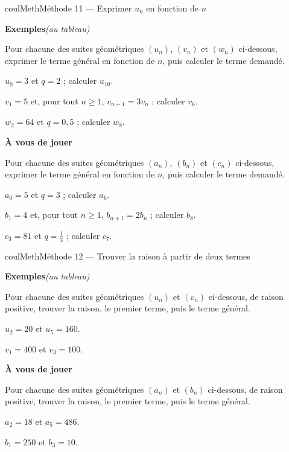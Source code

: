 \documentclass[11pt,a4paper]{article}
\makeatletter
\renewcommand{\ge}{\geqslant}
\newcounter{lycee@signet}
\newcommand{\signet}[3][]{\stepcounter{lycee@signet}%
  \edef\lycee@dest{\if\relax\detokenize{#1}\relax
    signet.\arabic{lycee@signet}\else#1\fi}%
  \hypertarget{\lycee@dest}{}\bookmark[level=#2,dest=\lycee@dest]{#3}}
\newcounter{methode}
\newenvironment{methodebox}[1][Méthode]{\stepcounter{methode}%
  \begin{boitecours}[phantom={\signet[methode-\arabic{methode}]{2}{#1}}]{coulMeth}{#1}}%
  {\end{boitecours}}
\newcommand{\etape}[1]{\par\smallskip\textbf{\color{coulMeth}#1}\par\nobreak\smallskip}
\newcommand{\autableau}{\hfill{\footnotesize\itshape\color{black!45}(au tableau)}}
\newcommand{\etapeexemples}{%
    \par\smallskip\textbf{\color{coulMeth}Exemples}\autableau\par\nobreak\smallskip}
\makeatother
\begin{document}
\begin{methodebox}[Méthode 11 --- Exprimer $u_{n}$ en fonction de $n$]
\etapeexemples
Pour chacune des suites géométriques $(u_{n})$, $(v_{n})$ et $(w_{n})$ ci-dessous, exprimer
le terme général en fonction de $n$, puis calculer le terme demandé.
\begin{questions}[label=\alph*)]
  \item $u_{0}=3$ et $q=2$ ; calculer $u_{10}$.
  \item $v_{1}=5$ et, pour tout $n\ge 1$, $v_{n+1}=3v_{n}$ ; calculer $v_{6}$.
  \item $w_{2}=64$ et $q=0{,}5$ ; calculer $w_{8}$.
\end{questions}

\etape{À vous de jouer}
Pour chacune des suites géométriques $(a_{n})$, $(b_{n})$ et $(c_{n})$ ci-dessous, exprimer
le terme général en fonction de $n$, puis calculer le terme demandé.
\begin{questions}[label=\alph*)]
  \item $a_{0}=5$ et $q=3$ ; calculer $a_{6}$.
  \item $b_{1}=4$ et, pour tout $n\ge 1$, $b_{n+1}=2b_{n}$ ; calculer $b_{8}$.
  \item $c_{3}=81$ et $q=\frac{1}{3}$ ; calculer $c_{7}$.
\end{questions}

\end{methodebox}

\begin{methodebox}[Méthode 12 --- Trouver la raison à partir de deux termes]
\etapeexemples
Pour chacune des suites géométriques $(u_{n})$ et $(v_{n})$ ci-dessous, de raison positive,
trouver la raison, le premier terme, puis le terme général.
\begin{questions}[label=\alph*)]
  \item $u_{2}=20$ et $u_{5}=160$.
  \item $v_{1}=400$ et $v_{3}=100$.
\end{questions}

\etape{À vous de jouer}
Pour chacune des suites géométriques $(a_{n})$ et $(b_{n})$ ci-dessous, de raison positive,
trouver la raison, le premier terme, puis le terme général.
\begin{questions}[label=\alph*)]
  \item $a_{2}=18$ et $a_{5}=486$.
  \item $b_{1}=250$ et $b_{3}=10$.
\end{questions}

\end{methodebox}
\end{document}
